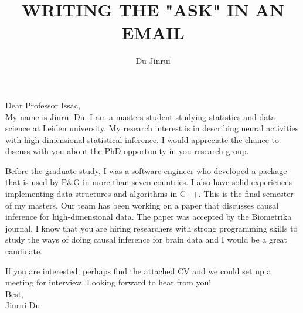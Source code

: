 \documentclass{article}
\title{WRITING THE "ASK" IN AN EMAIL}
\author{Du Jinrui}
\begin{document}
\maketitle	
\thispagestyle{empty}
\noindent Dear Professor Issac,
\\[2\baselineskip]
My name is Jinrui Du. I am a masters student studying statistics and data science at Leiden university. My research interest is in describing neural activities with high-dimensional statistical inference. I would appreciate the chance to discuss with you about the PhD opportunity in you research group.

Before the graduate study, I was a software engineer who developed a package that is used by P\&G in more than seven countries. I also have solid experiences implementing data structures and algorithms in C++. This is the final semester of my masters. Our team has been working on a paper that discusses causal inference for high-dimensional data. The paper was accepted by the Biometrika journal. I know that you are hiring researchers with strong programming skills to study the ways of doing causal inference for brain data and I would be a great candidate.

If you are interested, perhaps find the attached CV and we could set up a meeting for interview. Looking forward to hear from you!
\\[3\baselineskip]
\noindent Best, \\
\noindent Jinrui Du
\end{document}
